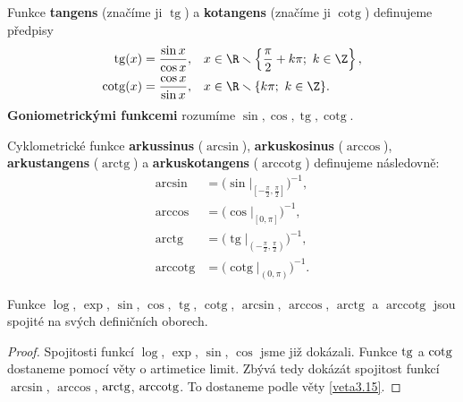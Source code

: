 \begin{definice} %
Funkce \textbf{tangens} (značíme ji $\operatorname{tg}$) a \textbf{kotangens} (značíme ji $\operatorname{cotg}$) definujeme předpisy
\begin{align*}
	\operatorname{tg}(x)=\frac{\sin x}{\cos x}&, &&x\in\R\smallsetminus\left\{\frac{\pi}{2}+k\pi;\ k\in\Z\right\}, \\
	\operatorname{cotg}(x)=\frac{\cos x}{\sin x}&, &&x\in\R\smallsetminus\{k\pi;\ k\in\Z\}.
\end{align*}
\textbf{Goniometrickými funkcemi} rozumíme $\sin,\cos,\operatorname{tg},\operatorname{cotg}$.
\end{definice}

\begin{definice}
Cyklometrické funkce \textbf{arkussinus} ($\arcsin$), \textbf{arkuskosinus} ($\arccos$), \textbf{arkustangens} ($\operatorname{arctg}$) a \textbf{arkuskotangens} ($\operatorname{arccotg}$) definujeme následovně:
\begin{align*}
\arcsin&=\big(\sin\vert_{[-\frac{\pi}{2},\frac{\pi}{2}]}\big)^{-1},\\
\arccos&=\big(\cos\vert_{[0,\pi]}\big)^{-1},\\
\operatorname{arctg}&=\big(\operatorname{tg}\vert_{(-\frac{\pi}{2},\frac{\pi}{2})}\big)^{-1},\\
\operatorname{arccotg}&=\big(\operatorname{cotg}\vert_{(0,\pi)}\big)^{-1}.
\end{align*}
\end{definice}

\begin{veta}\label{veta3.18}
Funkce $\log$, $\exp$, $\sin$, $\cos$, $\operatorname{tg}$, $\operatorname{cotg}$, $\arcsin$, $\arccos$, $\operatorname{arctg}$ a $\operatorname{arccotg}$ jsou spojité na svých definičních oborech.
\end{veta}

\begin{proof}
	Spojitosti funkcí $\log$, $\exp$, $\sin$, $\cos$ jsme již dokázali. Funkce $\operatorname{tg}$ a $\operatorname{cotg}$ dostaneme
	pomocí věty o artimetice limit. Zbývá tedy dokázát spojitost funkcí $\arcsin$, $\arccos$, $\operatorname{arctg}$, $\operatorname{arccotg}$.
	To dostaneme podle věty \ref{veta3.15}.
\end{proof}
